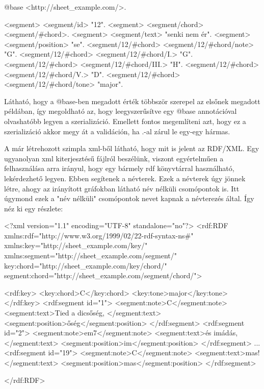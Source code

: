 \begin{xml}
@base <http://sheet_example.com/>.

<segment> <segment/id> "12".
<segment> <segment/chord> <segment/#chord>.
<segment> <segment/text> "senki nem ér".
<segment> <segment/position> "se".
<segment/12/#chord> <segment/12/#chord/note> "G".
<segment/12/#chord> <segment/12/#chord/I.> "G".
<segment/12/#chord> <segment/12/#chord/III.> "H".
<segment/12/#chord> <segment/12/#chord/V.> "D".
<segment/12/#chord> <segment/12/#chord/tone> "major".
\end{xml}

Látható, hogy a @base-ben megadott érték többször szerepel az elsőnek megadott példában, így megoldható az, hogy leegyszerűsítve egy @base annotációval olvashatóbb legyen a szerializáció. Emellett fontos megemlíteni azt, hogy ez a szerializáció akkor megy át a validáción, ha .-al zárul le egy-egy hármas.

A már létrehozott szimpla xml-ből látható, hogy mit is jelent az RDF/XML. Egy ugyanolyan xml kiterjesztésű fájlról beszélünk, viszont egyértelműen a felhasználása arra irányul, hogy egy bármely rdf könyvtárral használható, lekérdezhető legyen. Ebben segítenek a névterek. Ezek a névterek úgy jönnek létre, ahogy az irányított gráfokban látható név nélküli csomópontok is. Itt úgymond ezek a "név nélküli" csomópontok nevet kapnak a névterezés által.
Így néz ki egy részlete:

\begin{xml}
	<?xml version="1.1" encoding="UTF-8" standalone="no"?>
	<rdf:RDF 
			xmlns:rdf="http://www.w3.org/1999/02/22-rdf-syntax-ns#"
			xmlns:key="http://sheet_example.com/key/"
			xmlns:segment="http://sheet_example.com/segment/"
			key:chord="http://sheet_example.com/key/chord/"
			segment:chord="http://sheet_example.com/segment/chord/">
	
	    
	        <rdf:key>
	            <key:chord>C</key:chord>
	            <key:tone>major</key:tone>
	        </rdf:key>
	        <rdf:segment id="1">
	            <segment:note>C</segment:note>
	            <segment:text>Tied a dicsőség, </segment:text>
	            <segment:position>őség</segment:position>
	        </rdf:segment>
	        <rdf:segment id="2">
	            <segment:note>em7</segment:note>
	            <segment:text>és imádás,\n</segment:text>
	            <segment:position>im</segment:position>
	        </rdf:segment>
	        ...
	        <rdf:segment id="19">
	            <segment:note>C</segment:note>
	            <segment:text>mas!</segment:text>
	            <segment:position>mas</segment:position>
	        </rdf:segment>
	
	
	</rdf:RDF>
\end{xml}

